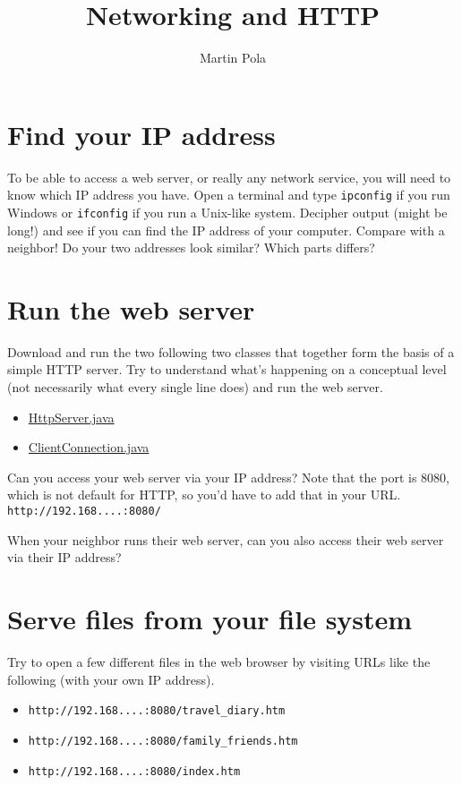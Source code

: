 \documentclass[a4paper, english]{article}
\title{Networking and HTTP}
\author{Martin Pola}
\date{}
\begin{document}
    \maketitle

    \section{Find your IP address}
        To be able to access a web server, or really any network service, you will need to know which IP address you have. Open a terminal and type \texttt{ipconfig} if you run Windows or \texttt{ifconfig} if you run a Unix-like system. Decipher output (might be long!) and see if you can find the IP address of your computer. Compare with a neighbor! Do your two addresses look similar? Which parts differs?

    \section{Run the web server}
        Download and run the two following two classes that together form the basis of a simple HTTP server. Try to understand what's happening on a conceptual level (not necessarily what every single line does) and run the web server.

        \begin{itemize}
            \item \href{https://klistra.in/OxLh3Boa}{HttpServer.java}
            \item \href{https://klistra.in/fdFQLTJQ}{ClientConnection.java}
        \end{itemize}
        
        Can you access your web server via your IP address? Note that the port is 8080, which is not default for HTTP, so you'd have to add that in your URL. \\
        \texttt{http://192.168....:8080/}

        When your neighbor runs their web server, can you also access their web server via their IP address?
    
    \section{Serve files from your file system}
        Try to open a few different files in the web browser by visiting URLs like the following (with your own IP address).

        \begin{itemize}
            \item \texttt{http://192.168....:8080/travel\_diary.htm}
            \item \texttt{http://192.168....:8080/family\_friends.htm}
            \item \texttt{http://192.168....:8080/index.htm}
        \end{itemize}
\end{document}
